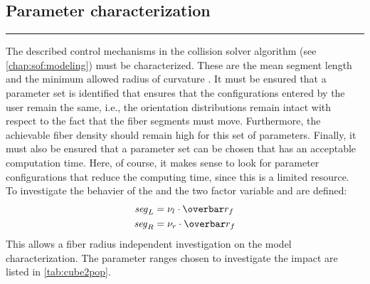 \subsection{Parameter characterization}\label{sec:modelSetup}
% 
\par
\noindent\rule{\textwidth}{2pt}
\par
% 
The described control mechanisms in the collision solver algorithm  (see \cref{chap:sof:modeling}) must be characterized.
These are the mean segment length \segLength{} and the minimum allowed radius of curvature \segRadius{}.
It must be ensured that a parameter set is identified that ensures that the configurations entered by the user remain the same, i.e., the orientation distributions remain intact with respect to the fact that the fiber segments must move.
Furthermore, the achievable fiber density should remain high for this set of parameters.
Finally, it must also be ensured that a parameter set can be chosen that has an acceptable computation time.
Here, of course, it makes sense to look for parameter configurations that reduce the computing time, since this is a limited resource.
\\
% 
To investigate the behavier of the \segLength{} and \segRadius{} the two factor variable \segLengthFactor{} and \segRadiusFactor{} are defined:
\begin{align}
    \begin{split}
        \segLength &= \segLengthFactor \cdot \fiberRadiusMean\\
        \segRadius &= \segRadiusFactor \cdot \fiberRadiusMean
    \end{split}
\end{align}
This allows a fiber radius independent investigation on the model characterization.
The parameter ranges chosen to investigate the impact are listed in \cref{tab:cube2pop}.
% 
